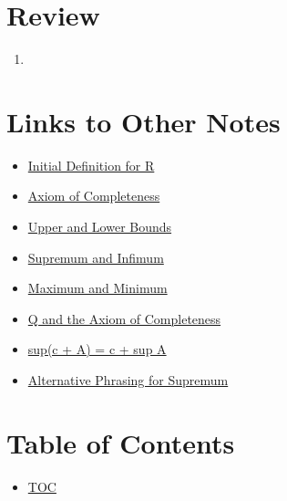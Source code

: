 \section*{Review}
\begin{enumerate}
  \item 
\end{enumerate}


\section*{Links to Other Notes}
\begin{itemize}
  \item \hyperref[202501180703]{Initial Definition for R}
  \item \hyperref[202501180727]{Axiom of Completeness}
  \item \hyperref[202501180734]{Upper and Lower Bounds}
  \item \hyperref[202501180743]{Supremum and Infimum}
  \item \hyperref[202501181241]{Maximum and Minimum}
  \item \hyperref[202501181257]{Q and the Axiom of Completeness}
  \item \hyperref[202501181310]{sup(c + A) = c + sup A}
  \item \hyperref[202501181335]{Alternative Phrasing for Supremum}
\end{itemize}

\section*{Table of Contents}

\begin{itemize}
  \item \hyperref[toc]{TOC}
\end{itemize}

